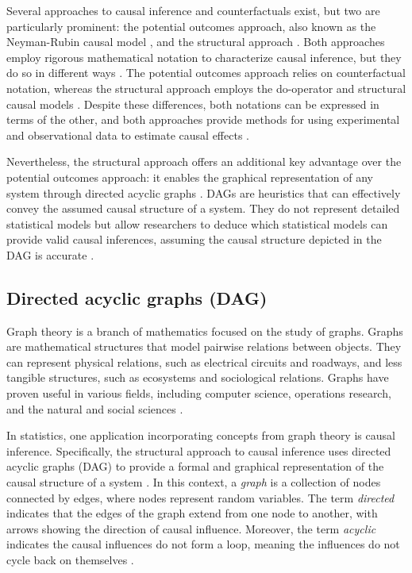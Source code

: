 \documentclass[
  authoryear,
  preprint,
  1p]{elsarticle}
\begin{document}
Several approaches to causal inference and counterfactuals exist, but
two are particularly prominent: the potential outcomes approach, also
known as the Neyman-Rubin causal model
\citep{Neyman_et_al_1923, Rubin_1974}, and the structural approach
\citep{Wright_1921, Pearl_2009, Pearl_et_al_2016}. Both approaches
employ rigorous mathematical notation to characterize causal inference,
but they do so in different ways \citep{Neal_2020}. The potential
outcomes approach relies on counterfactual notation, whereas the
structural approach employs the do-operator and structural causal models
\citep[SCM,][]{Pearl_2009, Pearl_et_al_2016}. Despite these differences,
both notations can be expressed in terms of the other, and both
approaches provide methods for using experimental and observational data
to estimate causal effects \citep{Pearl_2010}.

Nevertheless, the structural approach offers an additional key advantage
over the potential outcomes approach: it enables the graphical
representation of any system through directed acyclic graphs
\citep[DAG,][]{Gross_et_al_2018, Neal_2020}. DAGs are heuristics that
can effectively convey the assumed causal structure of a system. They do
not represent detailed statistical models but allow researchers to
deduce which statistical models can provide valid causal inferences,
assuming the causal structure depicted in the DAG is accurate
\citep{McElreath_2020}.

\subsection{Directed acyclic graphs (DAG)}\label{sec-framework-dag}

Graph theory is a branch of mathematics focused on the study of graphs.
Graphs are mathematical structures that model pairwise relations between
objects. They can represent physical relations, such as electrical
circuits and roadways, and less tangible structures, such as ecosystems
and sociological relations. Graphs have proven useful in various fields,
including computer science, operations research, and the natural and
social sciences \citep{Gross_et_al_2018}.

In statistics, one application incorporating concepts from graph theory
is causal inference. Specifically, the structural approach to causal
inference uses directed acyclic graphs (DAG) to provide a formal and
graphical representation of the causal structure of a system
\citep{Neal_2020}. In this context, a \emph{graph} is a collection of
nodes connected by edges, where nodes represent random variables. The
term \emph{directed} indicates that the edges of the graph extend from
one node to another, with arrows showing the direction of causal
influence. Moreover, the term \emph{acyclic} indicates the causal
influences do not form a loop, meaning the influences do not cycle back
on themselves \citep{McElreath_2020}.
\end{document}
